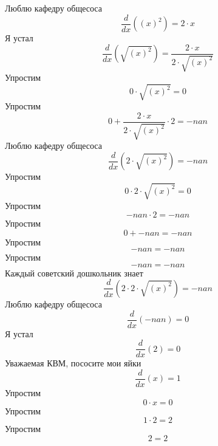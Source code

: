 \documentclass[12pt, a4paper]{article}
\begin{document}
Люблю кафедру общесоса
\begin{equation}
\frac{d}{dx}({(x)}^{2}) = 2 \cdot x
\end{equation}
Я устал
\begin{equation}
\frac{d}{dx}(\sqrt{{(x)}^{2}}) = \frac{2 \cdot x}{2 \cdot \sqrt{{(x)}^{2}}}
\end{equation}
Упростим
\begin{equation}
0 \cdot \sqrt{{(x)}^{2}} = 0
\end{equation}
Упростим
\begin{equation}
0+\frac{2 \cdot x}{2 \cdot \sqrt{{(x)}^{2}}} \cdot 2 = -nan
\end{equation}
Люблю кафедру общесоса
\begin{equation}
\frac{d}{dx}(2 \cdot \sqrt{{(x)}^{2}}) = -nan
\end{equation}
Упростим
\begin{equation}
0 \cdot 2 \cdot \sqrt{{(x)}^{2}} = 0
\end{equation}
Упростим
\begin{equation}
-nan \cdot 2 = -nan
\end{equation}
Упростим
\begin{equation}
0+-nan = -nan
\end{equation}
Упростим
\begin{equation}
-nan = -nan
\end{equation}
Упростим
\begin{equation}
-nan = -nan
\end{equation}
Каждый советский дошкольник знает
\begin{equation}
\frac{d}{dx}(2 \cdot 2 \cdot \sqrt{{(x)}^{2}}) = -nan
\end{equation}
Люблю кафедру общесоса
\begin{equation}
\frac{d}{dx}(-nan) = 0
\end{equation}
Я устал
\begin{equation}
\frac{d}{dx}(2) = 0
\end{equation}
Уважаемая КВМ, пососите мои яйки
\begin{equation}
\frac{d}{dx}(x) = 1
\end{equation}
Упростим
\begin{equation}
0 \cdot x = 0
\end{equation}
Упростим
\begin{equation}
1 \cdot 2 = 2
\end{equation}
Упростим
\begin{equation}
2 = 2
\end{equation}
\end{document}
